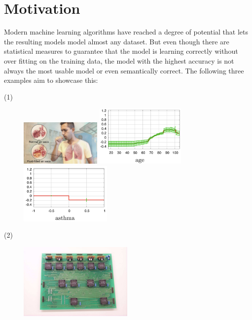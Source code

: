 \section{Motivation}
Modern machine learning algorithms have reached a degree of potential that lets the resulting models model almost any dataset.
But even though there are statistical measures to guarantee that the model is learning correctly without over fitting on the training data, the model with the highest accuracy is not always the most usable model or even semantically correct.
The following three examples aim to showcase this:

\par \noindent (1)

\begin{figure}
\centering
\includegraphics[height=6em,valign=t]{tex/introduction/pneumonia.png}
\includegraphics[height=8em,valign=t]{tex/introduction/age.png}
\includegraphics[height=8em,valign=t]{tex/introduction/asthma.png}
\caption{
}
\label{figs:pneumonia}
\end{figure}

\par \noindent (2)

\begin{figure}
\centering
\includegraphics[height=10em]{tex/introduction/emradio.png}
\caption{
}
\label{figs:emradio}
\end{figure}

